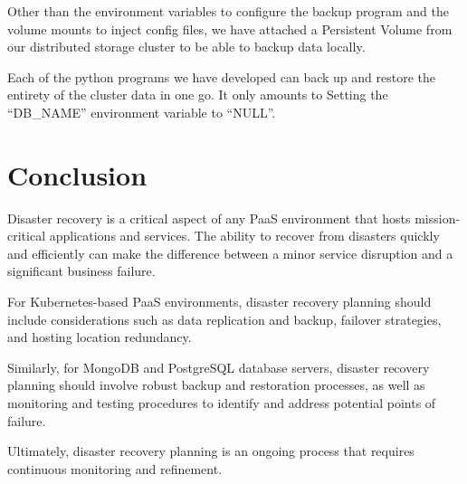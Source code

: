 \hspace{7mm}Other than the environment variables to configure the backup program and the volume mounts to inject config files, we have attached a Persistent Volume from our distributed storage cluster to be able to backup data locally. 

\hspace{7mm}Each of the python programs we have developed can back up and restore the entirety of the cluster data in one go. It only amounts to Setting the “DB\_NAME” environment variable to “NULL”. 

\section*{Conclusion}
\hspace{7mm}Disaster recovery is a critical aspect of any PaaS environment that hosts mission-critical applications and services. The ability to recover from disasters quickly and efficiently can make the difference between a minor service disruption and a significant business failure. 

\hspace{7mm}For Kubernetes-based PaaS environments, disaster recovery planning should include considerations such as data replication and backup, failover strategies, and hosting location redundancy.  

\hspace{7mm}Similarly, for MongoDB and PostgreSQL database servers, disaster recovery planning should involve robust backup and restoration processes, as well as monitoring and testing procedures to identify and address potential points of failure.  

\hspace{7mm}Ultimately, disaster recovery planning is an ongoing process that requires continuous monitoring and refinement.

